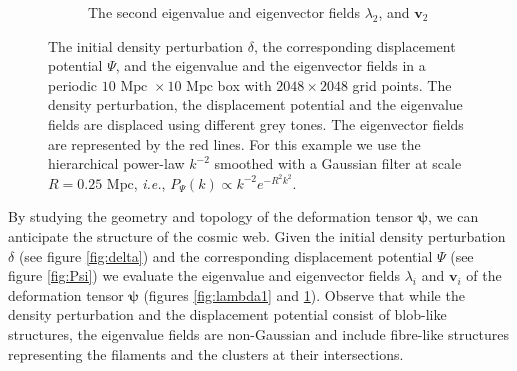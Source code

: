 \documentclass[a4paper, 11pt]{article}
\begin{document}
\begin{figure}
\begin{subfigure}[b]{0.49\textwidth}
\caption{The second eigenvalue and eigenvector fields $\lambda_2$, and $\bm{v}_2$}
\label{fig:lambda2}
\end{subfigure}
\caption{The initial density perturbation $\delta$, the corresponding displacement potential $\Psi$, and the eigenvalue and the eigenvector fields in a periodic $10\text{ Mpc } \times 10 \text{ Mpc}$ box with $2048 \times 2048$ grid points. The density perturbation, the displacement potential and the eigenvalue fields are displaced using different grey tones. The eigenvector fields are represented by the red lines. For this example we use the hierarchical power-law $k^{-2}$ smoothed with a Gaussian filter at scale $R=0.25 \text{ Mpc}$, \textit{i.e.}, $P_{\Psi}(k) \propto k^{-2}e^{-R^2 k^2}$.}
\label{fig:Example}
\end{figure}

By studying the geometry and topology of the deformation tensor $\bm{\psi}$, we can anticipate the structure of the cosmic web. Given the initial density perturbation $\delta$ (see figure \ref{fig:delta}) and the corresponding displacement potential $\Psi$ (see figure \ref{fig:Psi}) we evaluate the eigenvalue and eigenvector fields $\lambda_i$ and $\bm{v}_i$ of the deformation tensor $\bm{\psi}$ (figures \ref{fig:lambda1} and \ref{fig:lambda2}). Observe that while the density perturbation and the displacement potential consist of blob-like structures, the eigenvalue fields are non-Gaussian and include fibre-like structures representing the filaments and the clusters at their intersections.

\end{document}
